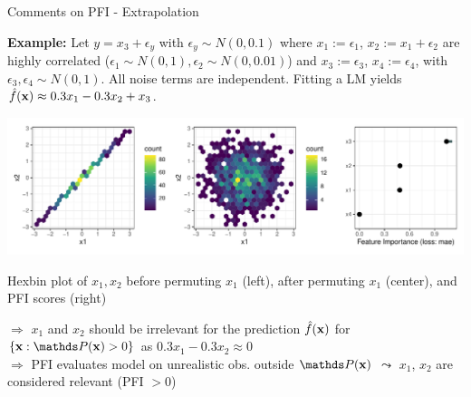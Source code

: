 \documentclass[11pt,compress,t,notes=noshow, aspectratio=169, xcolor=table]{beamer}
\begin{document}
\begin{frame}{Comments on PFI - Extrapolation}
 
 
 \textbf{Example:} Let $y = x_3 + \epsilon_y$ with $\epsilon_y \sim N(0, 0.1)$ where $x_1 :=  \epsilon_1$, $x_2 := x_1 + \epsilon_2$ are highly correlated ($\epsilon_1 \sim N(0,1), \epsilon_2 \sim N(0, 0.01)$) and $x_3 := \epsilon_3$, $x_4 := \epsilon_4$,  with $\epsilon_3, \epsilon_4 \sim N(0,1)$. All noise terms are independent.
 Fitting a LM yields $\fh(\xv) \approx 0.3 x_1 - 0.3 x_2 + x_3$.
\pause

\centerline{\includegraphics[width=0.9\linewidth]{figure_man/pfi_hexbin_extrapolation.pdf}}
\centerline{Hexbin plot of $x_1, x_2$ before permuting $x_1$ (left), after permuting $x_1$ (center), and PFI scores (right)}
\lz\pause
% 
$\Rightarrow$ $x_1$ and $x_2$ should be irrelevant for the prediction $\fh(\xv)$ for $\{\xv: \P(\xv) > 0\}$ as $0.3 x_1 - 0.3 x_2 \approx 0$ \\
$\Rightarrow$ PFI evaluates model on unrealistic obs. outside $\P(\xv)$ $\leadsto$ $x_1$, $x_2$ are considered relevant (PFI $> 0$)

 \end{frame}
\end{document}
